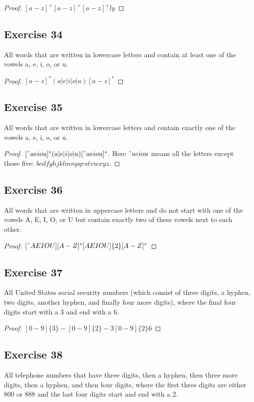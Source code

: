 \documentclass[14pt]{extarticle}
\begin{document}
\begin{proof}
    \([a-z]^+[a-z]^+[a-z]^+ ly\)
\end{proof}

\subsection{Exercise 34}
All words that are written in lowercase letters and contain at least one of the vowels a, e, i, o, or u.

\begin{proof}
    \([a - z]^*(a | e | i | o | u)[a - z]^*\)
\end{proof}

\subsection{Exercise 35}
All words that are written in lowercase letters and contain exactly one of the vowels a, e, i, o, or u.

\begin{proof}
    \([\string^ aeiou]^*(a|e|i|o|u)[\string^ aeiou]^*\). Here \(\string^ aeiou\) means  all the letters except those five:
    \(bcdfghjklmnpqrstvwxyz\).
\end{proof}

\subsection{Exercise 36}
All words that are written in uppercase letters and do not start with one of the vowels A, E, I, O, or U but contain
exactly two of these vowels next to each other.

\begin{proof}
    \([\string^ AEIOU][A-Z]^*[AEIOU]\{2\}[A-Z]^*\)
\end{proof}

\subsection{Exercise 37}
All United States social security numbers (which consist of three digits, a hyphen, two digits, another hyphen, and
finally four more digits), where the final four digits start with a 3 and end with a 6.

\begin{proof}
    \([0 - 9]\{3\} - [0 - 9]\{2\} - 3[0 - 9]\{2\}6\)
\end{proof}

\subsection{Exercise 38}
All telephone numbers that have three digits, then a hyphen, then three more digits, then a hyphen, and then four digits,
where the first three digits are either 800 or 888 and the last four digits start and end with a 2.
\end{document}
